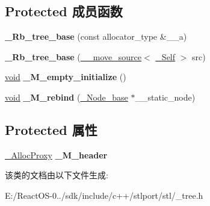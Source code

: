 \subsection*{Protected 成员函数}
\begin{DoxyCompactItemize}
\item 
\mbox{\label{class___rb__tree__base_a090b0d60b27255f9c2ca6b63098d1b18}} 
{\bfseries \+\_\+\+Rb\+\_\+tree\+\_\+base} (const allocator\+\_\+type \&\+\_\+\+\_\+a)
\item 
\mbox{\label{class___rb__tree__base_ab1e9ad4609fd67fa6d9746f1f6eb429e}} 
{\bfseries \+\_\+\+Rb\+\_\+tree\+\_\+base} (\hyperlink{class____move__source}{\+\_\+\+\_\+move\+\_\+source}$<$ \hyperlink{class___rb__tree__base}{\+\_\+\+Self} $>$ src)
\item 
\mbox{\label{class___rb__tree__base_a4a5915f1bda1d8e63abdb09c3b305129}} 
\hyperlink{interfacevoid}{void} {\bfseries \+\_\+\+M\+\_\+empty\+\_\+initialize} ()
\item 
\mbox{\label{class___rb__tree__base_a167387217a77ab85b490baa7483bf340}} 
\hyperlink{interfacevoid}{void} {\bfseries \+\_\+\+M\+\_\+rebind} (\hyperlink{struct___rb__tree__node__base}{\+\_\+\+Node\+\_\+base} $\ast$\+\_\+\+\_\+static\+\_\+node)
\end{DoxyCompactItemize}
\subsection*{Protected 属性}
\begin{DoxyCompactItemize}
\item 
\mbox{\label{class___rb__tree__base_ad71e9ddd604866f96a7f6392c15ce312}} 
\hyperlink{class___s_t_l_p__alloc__proxy}{\+\_\+\+Alloc\+Proxy} {\bfseries \+\_\+\+M\+\_\+header}
\end{DoxyCompactItemize}


该类的文档由以下文件生成\+:\begin{DoxyCompactItemize}
\item 
E\+:/\+React\+O\+S-\/0../sdk/include/c++/stlport/stl/\+\_\+tree.\+h\end{DoxyCompactItemize}
